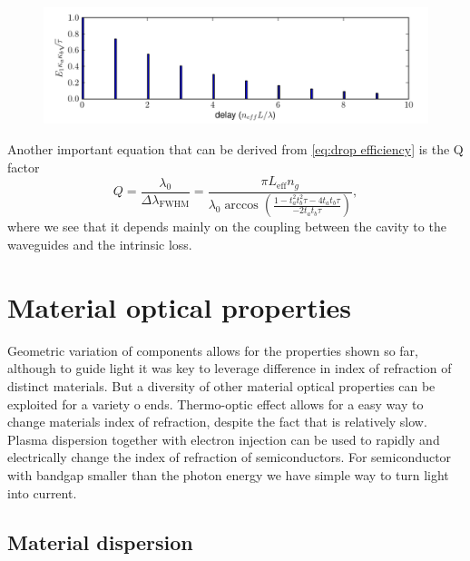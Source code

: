 \documentclass[12pt,twoside,english]{book}
\renewcommand{\~}{\perispomeni}%
\numberwithin{equation}{section}
\numberwithin{figure}{section}
\begin{document}
\begin{figure}
\centering \includegraphics{exp_decay}
\caption{\label{fig:exp decay}}
\end{figure}
Another important equation that can be derived from \ref{eq:drop efficiency} is the Q factor
\begin{equation}
Q=\frac{\lambda_{0}}{\Delta\lambda_{\text{FWHM}}}=\frac{\pi L_{\text{eff}}n_{g}}{\lambda_{0}\arccos\left(\frac{1-t_{a}^{2}t_{b}^{2}\tau-4t_{a}t_{b}\tau}{-2t_{a}t_{b}\tau}\right)},
\label{eq:Q}
\end{equation}
where we see that it depends mainly on the coupling between the cavity to the waveguides and the intrinsic loss.

\section{Material optical properties}

Geometric variation of components allows for the properties shown so far, although to guide light it was key to leverage difference in index of refraction of distinct materials. But a diversity of other material optical properties can be exploited for a variety o ends. Thermo-optic effect allows for a easy way to change materials index of refraction, despite the fact that is relatively slow. Plasma dispersion together with electron injection can be used to rapidly and electrically change the index of refraction of semiconductors. For semiconductor with bandgap smaller than the photon energy we have simple way to turn light into current.

\subsection{Material dispersion}
\end{document}
